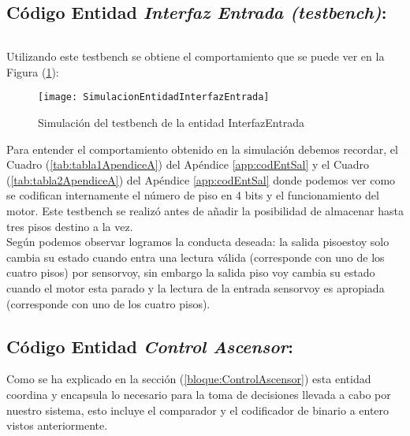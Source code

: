 \subsection{Código Entidad \textit{Interfaz Entrada (testbench)}:} \label{code:InterfazEntrada_tb}
	\inputminted[frame=lines,fontsize=\footnotesize,linenos]{vhdl}{CodeFiles/EntidadInterfazEntrada_tb.vhd}

    Utilizando este testbench se obtiene el comportamiento que se puede ver en la Figura (\ref{fig:SimulacionEntidadInterfazEntrada}):

    \begin{figure}[H]
		    \centering
		    \texttt{[image: SimulacionEntidadInterfazEntrada]}
		    \caption{Simulación del testbench de la entidad InterfazEntrada}
		    \label{fig:SimulacionEntidadInterfazEntrada}
	\end{figure}

	Para entender el comportamiento obtenido en la simulación debemos recordar, el Cuadro (\ref{tab:tabla1ApendiceA}) del Apéndice \ref{app:codEntSal} y el Cuadro (\ref{tab:tabla2ApendiceA}) del Apéndice \ref{app:codEntSal} donde podemos ver como se codifican internamente el número de piso en 4 bits y el funcionamiento del motor. Este testbench se realizó antes de añadir la posibilidad de almacenar hasta tres pisos destino a la vez. \\
	
	Según podemos observar logramos la conducta deseada: la salida pisoestoy solo cambia su estado cuando entra una lectura válida (corresponde con uno de los cuatro pisos) por sensorvoy, sin embargo la salida piso voy cambia su estado cuando el motor esta parado y la lectura de la entrada sensorvoy es apropiada (corresponde con uno de los cuatro pisos).

\subsection{Código Entidad \textit{Control Ascensor}:} \label{code:ControlAscensor}
	Como se ha explicado en la sección (\ref{bloque:ControlAscensor}) esta entidad coordina y encapsula lo necesario para la toma de decisiones llevada a cabo por nuestro sistema, esto incluye el comparador y el codificador de binario a entero vistos anteriormente. \\ 

	\inputminted[frame=lines,fontsize=\footnotesize,linenos]{vhdl}{CodeFiles/EntidadControlAscensor.vhd}

